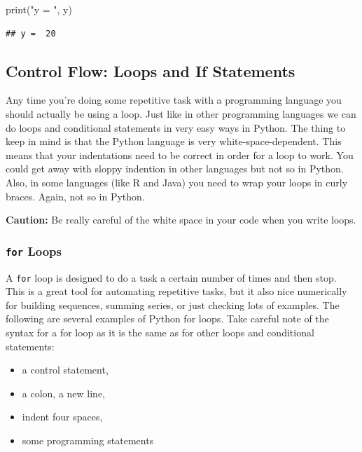 \documentclass[
]{book}
\newenvironment{Shaded}{\begin{snugshade}}{\end{snugshade}}
\newcommand{\BuiltInTok}[1]{#1}
\newcommand{\NormalTok}[1]{#1}
\newcommand{\StringTok}[1]{\textcolor[rgb]{0.31,0.60,0.02}{#1}}
\providecommand{\tightlist}{%
  \setlength{\itemsep}{0pt}\setlength{\parskip}{0pt}}
\theoremstyle{definition}
\theoremstyle{definition}
\theoremstyle{definition}
\theoremstyle{remark}
\begin{document}
\begin{Shaded}
\begin{Highlighting}[]
\BuiltInTok{print}\NormalTok{(}\StringTok{"y = "}\NormalTok{, y)}
\end{Highlighting}
\end{Shaded}

\begin{verbatim}
## y =  20
\end{verbatim}

\hypertarget{control-flow-loops-and-if-statements}{%
\subsection{Control Flow: Loops and If Statements}\label{control-flow-loops-and-if-statements}}

Any time you're doing some repetitive task with a programming language you should actually be using a loop. Just like in other programming languages we can do loops and conditional statements in very easy ways in Python. The thing to keep in mind is that the Python language is very white-space-dependent. This means that your indentations need to be correct in order for a loop to work. You could get away with sloppy indention in other languages but not so in Python. Also, in some languages (like R and Java) you need to wrap your loops in curly braces. Again, not so in Python.

\textbf{Caution:} Be really careful of the white space in your code when you write loops.

\hypertarget{for-loops}{%
\subsubsection{\texorpdfstring{\texttt{for} Loops}{for Loops}}\label{for-loops}}

A \texttt{for} loop is designed to do a task a certain number of times and then stop. This is a great tool for automating repetitive tasks, but it also nice numerically for building sequences, summing series, or just checking lots of examples. The following are several examples of Python for loops. Take careful note of the syntax for a for loop as it is the same as for other loops and conditional statements:

\begin{itemize}
\tightlist
\item
  a control statement,
\item
  a colon, a new line,
\item
  indent four spaces,
\item
  some programming statements
\end{itemize}
\end{document}
